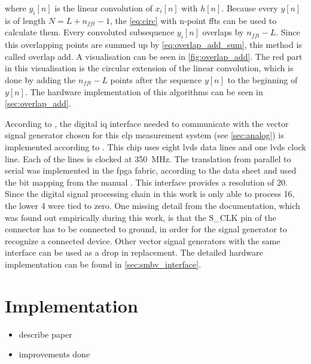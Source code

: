 \documentclass[12pt,a4paper,parskip=full,abstract=true,BCOR=10mm,twoside,open=right]{scrreprt}
\begin{document}
where $y_i[n]$ is the linear convolution of $x_i[n]$ with $h[n]$. Because every $y[n]$ is of length
$N = L + n_{fft} -1$, the \cref{eq:circ} with n-point \glspl{fft} can be used to calculate them.
Every convoluted subsequence $y_i[n]$ overlaps by $n_{fft} - L$. Since this overlapping
points are summed up by \cref{eq:overlap_add_sum}, this method is called overlap
add. A visualisation can be seen in \cref{fig:overlap_add}. The red part in this visualisation
is the circular extension of the linear convolution, which is done by adding the
$n_{fft} - L$ points after the sequence $y[n]$ to the beginning of $y[n]$. The hardware implementation
of this algorithms can be seen in \cref{sec:overlap_add}.

According to \cite{fsq_b17}, the digital \gls{iq} interface needed to communicate
with the vector signal generator chosen for this \gls{elp} measurement
system (see \cref{sec:analog}) is implemented according to \cite{ds90cr485}. This
chip uses eight \gls{lvds} data lines and one \gls{lvds} clock line. Each of the lines
is clocked at \SI{350}{\mega\hertz}. The translation from parallel to serial was implemented
in the \gls{fpga} fabric, according to the data sheet \cite{ds90cr485} and used
the bit mapping from the manual \cite{fsq_b17}. This interface provides a resolution of \SI{20}{\bit}.
Since the digital signal processing chain in this work is only able to process \SI{16}{\bit},
the lower \SI{4}{\bit} were tied to zero. One missing detail from the documentation,
which was found out empirically during this work, is that the S\_CLK pin of the connector
has to be connected to ground, in order for the signal generator to recognize a connected
device. Other vector signal generators with the same interface can be used as a drop in
replacement. The detailed hardware implementation can be found in \cref{sec:smbv_interface}.


\chapter{ Implementation}
\label{chap:fpga}

\begin{itemize}
    \item describe paper \cite{hashim_active_2008}
    \item improvements done
\end{itemize}
\end{document}
